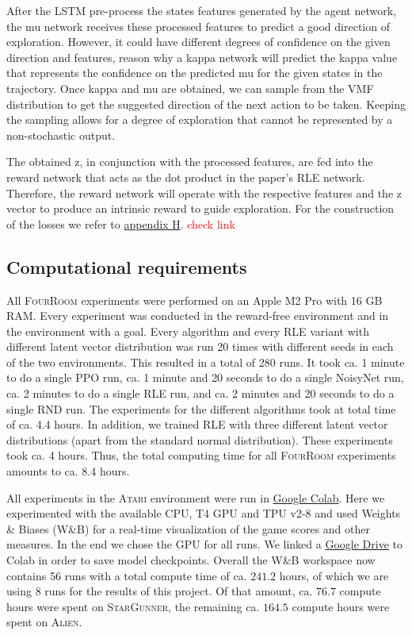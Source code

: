 \documentclass[10pt]{article} %
\begin{document}
After the LSTM pre-process the states features generated by the agent network, the mu network receives these processed features to predict a good direction of exploration. However, it could have different degrees of confidence on the given direction and features, reason why a kappa network will predict the kappa value that represents the confidence on the predicted mu for the given states in the trajectory. Once kappa and mu are obtained, we can sample from the VMF distribution to get the suggested direction of the next action to be taken. Keeping the sampling allows for a degree of exploration that cannot be represented by a non-stochastic output. 

The obtained z, in conjunction with the processed features, are fed into the reward network that acts as the dot product in the paper's RLE network. Therefore, the reward network will operate with the respective features and the z vector to produce an intrinsic reward to guide exploration. For the construction of the losses we refer to \hyperlink{na-vmf}{appendix H}. \textcolor{red}{check link}

\hypertarget{computational-requirements}{\subsection{Computational requirements}}

All \textsc{FourRoom} experiments were performed on an Apple M2 Pro with 16 GB RAM. Every experiment was conducted in the reward-free environment and in the environment with a goal. Every algorithm and every RLE variant with different latent vector distribution was run 20 times with different seeds in each of the two environments. This resulted in a total of 280 runs. It took ca. 1 minute to do a single PPO run, ca. 1 minute and 20 seconds to do a single NoisyNet run, ca. 2 minutes to do a single RLE run, and ca. 2 minutes and 20 seconds to do a single RND run. The experiments for the different algorithms took at total time of ca. 4.4 hours. In addition, we trained RLE with three different latent vector distributions (apart from the standard normal distribution). These experiments took ca. 4 hours. Thus, the total computing time for all \textsc{FourRoom} experiments amounts to ca. 8.4 hours.

\noindent All experiments in the \textsc{Atari} environment were run in \href{https://colab.research.google.com/}{Google Colab}. Here we experimented with the available CPU, T4 GPU and TPU v2-8 and used Weights \& Biases (W\&B) for a real-time visualization of the game scores and other measures. In the end we chose the GPU for all runs. We linked a \href{https://drive.google.com}{Google Drive} to Colab in order to save model checkpoints. Overall the W\&B workspace now contains 56 runs with a total compute time of ca. $241.2$ hours, of which we are using 8 runs for the results of this project. Of that amount, ca. $76.7$ compute hours were spent on \textsc{StarGunner}, the remaining ca. $164.5$ compute hours were spent on \textsc{Alien}.
\end{document}
